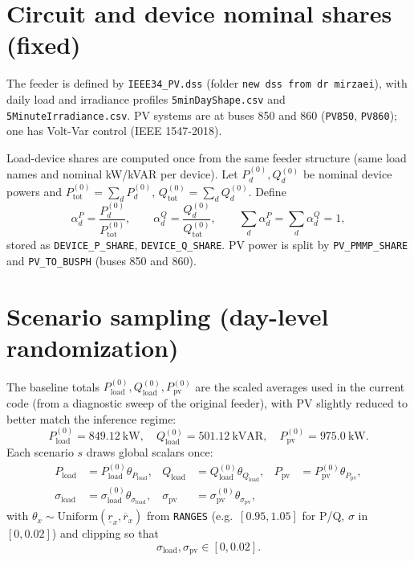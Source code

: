 \documentclass[11pt]{article}
\begin{document}
\section{Circuit and device nominal shares (fixed)}

The feeder is defined by \texttt{IEEE34\_PV.dss} (folder \texttt{new dss from dr mirzaei}), with
daily load and irradiance profiles \texttt{5minDayShape.csv} and \texttt{5MinuteIrradiance.csv}.
PV systems are at buses 850 and 860 (\texttt{PV850}, \texttt{PV860}); one has Volt-Var control (IEEE 1547-2018).

Load-device shares are computed once from the same feeder structure (same load names and nominal kW/kVAR per device).
Let $P_d^{(0)},Q_d^{(0)}$ be nominal device powers and
$P_{\mathrm{tot}}^{(0)}=\sum_d P_d^{(0)}$, $Q_{\mathrm{tot}}^{(0)}=\sum_d Q_d^{(0)}$.
Define
\[
\alpha_d^P=\frac{P_d^{(0)}}{P_{\mathrm{tot}}^{(0)}},\qquad
\alpha_d^Q=\frac{Q_d^{(0)}}{Q_{\mathrm{tot}}^{(0)}},\qquad
\sum_d\alpha_d^P=\sum_d\alpha_d^Q=1,
\]
stored as \texttt{DEVICE\_P\_SHARE}, \texttt{DEVICE\_Q\_SHARE}.
PV power is split by \texttt{PV\_PMMP\_SHARE} and \texttt{PV\_TO\_BUSPH} (buses 850 and 860).

\section{Scenario sampling (day-level randomization)}

The baseline totals $P_{\mathrm{load}}^{(0)},Q_{\mathrm{load}}^{(0)},P_{\mathrm{pv}}^{(0)}$ are the scaled averages used in the current code (from a diagnostic sweep of the original feeder), with PV slightly reduced to better match the inference regime:
\[
P_{\mathrm{load}}^{(0)} = 849.12~\mathrm{kW},\quad
Q_{\mathrm{load}}^{(0)} = 501.12~\mathrm{kVAR},\quad
P_{\mathrm{pv}}^{(0)} = 975.0~\mathrm{kW}.
\]
Each scenario $s$ draws global scalars once:
\begin{align*}
P_{\mathrm{load}} &= P_{\mathrm{load}}^{(0)}\theta_{P_{\mathrm{load}}},&
Q_{\mathrm{load}} &= Q_{\mathrm{load}}^{(0)}\theta_{Q_{\mathrm{load}}},&
P_{\mathrm{pv}} &= P_{\mathrm{pv}}^{(0)}\theta_{P_{\mathrm{pv}}},\\
\sigma_{\mathrm{load}}&=\sigma_{\mathrm{load}}^{(0)}\theta_{\sigma_{\mathrm{load}}},&
\sigma_{\mathrm{pv}}&=\sigma_{\mathrm{pv}}^{(0)}\theta_{\sigma_{\mathrm{pv}}},
\end{align*}
with $\theta_x\sim\mathrm{Uniform}(\underline r_x,\overline r_x)$ from \texttt{RANGES} (e.g.\ $[0.95,1.05]$ for P/Q, $\sigma$ in $[0,0.02]$) and clipping so that
\[
\sigma_{\mathrm{load}},\sigma_{\mathrm{pv}}\in[0,0.02].
\]
\end{document}
